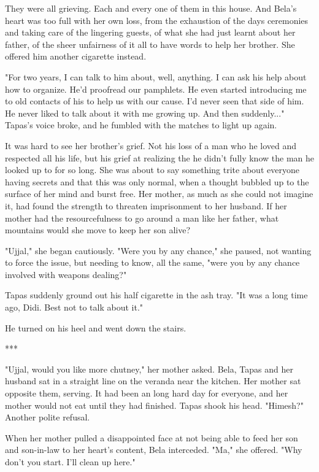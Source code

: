 \documentclass{amsart}
\begin{document}
They were all grieving. Each and every one of them in this house. And Bela's heart was too full with her own loss, from the exhaustion of the days ceremonies and taking care of the lingering guests, of what she had just learnt about her father, of the sheer unfairness of it all to have words to help her brother. She offered him another cigarette instead.

"For two years, I can talk to him about, well, anything. I can ask his help about how to organize. He'd proofread our pamphlets. He even started introducing me to old contacts of his to help us with our cause. I'd never seen that side of him. He never liked to talk about it with me growing up. And then suddenly..." Tapas's voice broke, and he fumbled with the matches to light up again.

It was hard to see her brother's grief. Not his loss of a man who he loved and respected all his life, but his grief at realizing the he didn't fully know the man he looked up to for so long. She was about to say something trite about everyone having secrets and that this was only normal, when a thought bubbled up to the surface of her mind and burst free. Her mother, as much as she could not imagine it, had found the strength to threaten imprisonment to her husband. If her mother had the resourcefulness to go around a man like her father, what mountains would she move to keep her son alive? 

"Ujjal," she began cautiously. "Were you by any chance," she paused, not wanting to force the issue, but needing to know, all the same, "were you by any chance involved with weapons dealing?"

Tapas suddenly ground out his half cigarette in the ash tray. "It was a long time ago, Didi. Best not to talk about it." 

He turned on his heel and went down the stairs.

\begin{center} *** \end{center}

"Ujjal, would you like more chutney," her mother asked. Bela, Tapas and her husband sat in a straight line on the veranda near the kitchen. Her mother sat opposite them, serving. It had been an long hard day for everyone, and her mother would not eat until they had finished. Tapas shook his head. "Himesh?" Another polite refusal. 

When her mother pulled a disappointed face at not being able to feed her son and son-in-law to her heart's content, Bela interceded.  "Ma," she offered. "Why don't you start. I'll clean up here."
\end{document}
